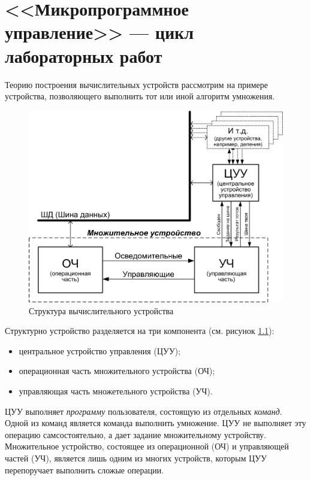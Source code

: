 \chapter{<<Микропрограммное управление>> --- цикл лабораторных работ}
\label{ch::practice}

Теорию построения вычислительных устройств рассмотрим на примере устройства, позволяющего выполнить тот или иной алгоритм умножения.

\begin{figure}[!ht]
    \centering
    \includegraphics{fig/model}
    \caption{Структура вычислительного устройства}
    \label{fig::ch::practice::model}
\end{figure}

Структурно устройство разделяется на три компонента (см. рисунок \ref{fig::ch::practice::model}): 
\begin{itemize}
    \item центральное устройство управления (ЦУУ);
    \item операционная часть множительного устройства (ОЧ); 
    \item управляющая часть множетельного устройства (УЧ).
\end{itemize}

ЦУУ выполняет \emph{программу} пользователя, состоящую из отдельных \emph{команд}. Одной из команд является команда выполнить умножение. ЦУУ не выполняет эту операцию самсостоятельно, а дает задание множительному устройству. Множительное устройство, состоящее из операционной (ОЧ) и управляющей частей (УЧ), является лишь одним из многих устройств, которым ЦУУ перепоручает выполнить сложые операции.


